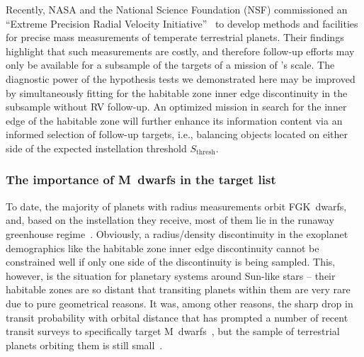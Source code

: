 \documentclass[twocolumn,twocolappendix,linenumbers]{aastex631}
\begin{document}
Recently, NASA and the National Science Foundation (NSF) commissioned an ``Extreme Precision Radial Velocity Initiative''~\citep{Crass2021} to develop methods and facilities for precise mass measurements of temperate terrestrial planets.
Their findings highlight that such measurements are costly, and therefore follow-up efforts may only be available for a subsample of the targets of a mission of \plato's scale.
The diagnostic power of the hypothesis tests we demonstrated here may be improved by simultaneously fitting for the habitable zone inner edge discontinuity in the subsample without RV follow-up.
An optimized mission in search for the inner edge of the habitable zone will further enhance its information content via an informed selection of follow-up targets, i.e., balancing objects located on either side of the expected instellation threshold $S_\mathrm{thresh}$.

\subsubsection{The importance of M~dwarfs in the target list}
To date, the majority of planets with radius measurements orbit FGK~dwarfs, and, based on the instellation they receive, most of them lie in the runaway greenhouse regime~\citep{Thompson2018}.
Obviously, a radius/density discontinuity in the exoplanet demographics like the habitable zone inner edge discontinuity cannot be constrained well if only one side of the discontinuity is being sampled.
This, however, is the situation for planetary systems around Sun-like stars -- their habitable zones are so distant that transiting planets within them are very rare due to pure geometrical reasons.
It was, among other reasons, the sharp drop in transit probability with orbital distance that has prompted a number of recent transit surveys to specifically target M~dwarfs~\citep[e.g.,][]{Irwin2009,Obermeier2016,Delrez2018,Sebastian2021,Dietrich2023}, but the sample of terrestrial planets orbiting them is still small~\citep[e.g.,][]{Berger2020,Hardegree-Ullman2020a}.
\end{document}
